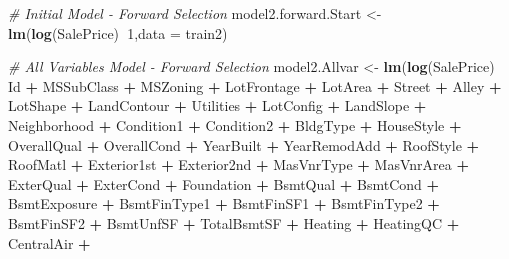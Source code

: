 \documentclass[american,]{article}
\newenvironment{Shaded}{\begin{snugshade}}{\end{snugshade}}
\newcommand{\CommentTok}[1]{\textcolor[rgb]{0.56,0.35,0.01}{\textit{#1}}}
\newcommand{\DataTypeTok}[1]{\textcolor[rgb]{0.13,0.29,0.53}{#1}}
\newcommand{\DecValTok}[1]{\textcolor[rgb]{0.00,0.00,0.81}{#1}}
\newcommand{\KeywordTok}[1]{\textcolor[rgb]{0.13,0.29,0.53}{\textbf{#1}}}
\newcommand{\NormalTok}[1]{#1}
\newcommand{\OperatorTok}[1]{\textcolor[rgb]{0.81,0.36,0.00}{\textbf{#1}}}
\newcommand{\StringTok}[1]{\textcolor[rgb]{0.31,0.60,0.02}{#1}}
\theoremstyle{definition}
\theoremstyle{definition}
\theoremstyle{definition}
\theoremstyle{remark}
\begin{document}
\begin{Shaded}
\begin{Highlighting}[]
\CommentTok{# Initial Model - Forward Selection}
\NormalTok{model2.forward.Start <-}\StringTok{ }\KeywordTok{lm}\NormalTok{(}\KeywordTok{log}\NormalTok{(SalePrice)}\OperatorTok{~}\DecValTok{1}\NormalTok{,}\DataTypeTok{data =}\NormalTok{ train2)}

\CommentTok{# All Variables Model - Forward Selection}
\NormalTok{model2.Allvar <-}\StringTok{ }\KeywordTok{lm}\NormalTok{(}\KeywordTok{log}\NormalTok{(SalePrice) }\OperatorTok{~}\StringTok{ }\NormalTok{Id }\OperatorTok{+}\StringTok{ }\NormalTok{MSSubClass }\OperatorTok{+}\StringTok{ }\NormalTok{MSZoning }\OperatorTok{+}\StringTok{ }\NormalTok{LotFrontage }\OperatorTok{+}\StringTok{ }\NormalTok{LotArea }\OperatorTok{+}\StringTok{ }\NormalTok{Street }\OperatorTok{+}\StringTok{ }
\StringTok{                      }\NormalTok{Alley }\OperatorTok{+}\StringTok{ }\NormalTok{LotShape }\OperatorTok{+}\StringTok{ }\NormalTok{LandContour }\OperatorTok{+}\StringTok{ }\NormalTok{Utilities }\OperatorTok{+}\StringTok{ }\NormalTok{LotConfig }\OperatorTok{+}\StringTok{ }\NormalTok{LandSlope }\OperatorTok{+}
\StringTok{                      }\NormalTok{Neighborhood }\OperatorTok{+}\StringTok{ }\NormalTok{Condition1 }\OperatorTok{+}\StringTok{ }\NormalTok{Condition2 }\OperatorTok{+}\StringTok{ }\NormalTok{BldgType }\OperatorTok{+}\StringTok{ }\NormalTok{HouseStyle }\OperatorTok{+}\StringTok{ }\NormalTok{OverallQual }\OperatorTok{+}
\StringTok{                      }\NormalTok{OverallCond }\OperatorTok{+}\StringTok{ }\NormalTok{YearBuilt }\OperatorTok{+}\StringTok{ }\NormalTok{YearRemodAdd }\OperatorTok{+}\StringTok{ }\NormalTok{RoofStyle }\OperatorTok{+}\StringTok{ }\NormalTok{RoofMatl }\OperatorTok{+}\StringTok{ }\NormalTok{Exterior1st }\OperatorTok{+}
\StringTok{                      }\NormalTok{Exterior2nd }\OperatorTok{+}\StringTok{ }\NormalTok{MasVnrType }\OperatorTok{+}\StringTok{ }\NormalTok{MasVnrArea }\OperatorTok{+}\StringTok{ }\NormalTok{ExterQual }\OperatorTok{+}\StringTok{ }\NormalTok{ExterCond }\OperatorTok{+}\StringTok{ }\NormalTok{Foundation }\OperatorTok{+}
\StringTok{                      }\NormalTok{BsmtQual }\OperatorTok{+}\StringTok{ }\NormalTok{BsmtCond }\OperatorTok{+}\StringTok{ }\NormalTok{BsmtExposure }\OperatorTok{+}\StringTok{ }\NormalTok{BsmtFinType1 }\OperatorTok{+}\StringTok{ }\NormalTok{BsmtFinSF1 }\OperatorTok{+}\StringTok{ }\NormalTok{BsmtFinType2 }
                    \OperatorTok{+}\StringTok{ }\NormalTok{BsmtFinSF2 }\OperatorTok{+}\StringTok{ }\NormalTok{BsmtUnfSF }\OperatorTok{+}\StringTok{ }\NormalTok{TotalBsmtSF }\OperatorTok{+}\StringTok{ }\NormalTok{Heating }\OperatorTok{+}\StringTok{ }\NormalTok{HeatingQC }\OperatorTok{+}\StringTok{ }\NormalTok{CentralAir }\OperatorTok{+}\StringTok{ }

\end{Highlighting}
\end{Shaded}
\end{document}
